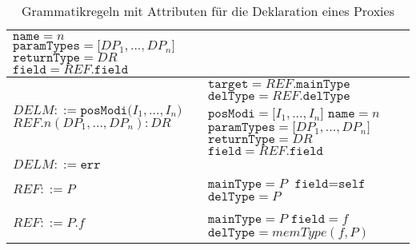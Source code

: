 \begin{table}[H]
\begin{tabular}{|p{6cm}|p{10cm}|}
$\texttt{name} = \mathit{n}$\newline
$\texttt{paramTypes} = \mathit{[DP_1},...,\mathit{DP_n]}$\newline
$\texttt{returnType} = \mathit{DR}$\newline
$\texttt{field} = \mathit{REF}\texttt{.field}$
\\
\hline
$\mathit{DELM} ::=\texttt{posModi(} \mathit{I_1},...,\mathit{I_n} \texttt{)}$\newline
$\mathit{REF}\texttt{.}n(\mathit{DP_1},...,\mathit{DP_n}):DR $  
&
$\texttt{target} = \mathit{REF}.\texttt{mainType}$\newline
$\texttt{delType} = \mathit{REF}.\texttt{delType}$\newline
$\texttt{posModi} = \mathit{[I_1},...,\mathit{I_n]}$\newline
$\texttt{name} = \mathit{n}$\newline
$\texttt{paramTypes} = \mathit{[DP_1},...,\mathit{DP_n]}$\newline
$\texttt{returnType} = \mathit{DR}$\newline
$\texttt{field} = \mathit{REF}\texttt{.field}$
\\
\hline
$\mathit{DELM} ::= \texttt{err} $  
&
\\
\hline
$\mathit{REF} ::= \mathit{P}$
& 
$\texttt{mainType} = \mathit{P}$\newline
$\texttt{field} = \texttt{self}$\newline
$\texttt{delType} = \mathit{P}$
\\
\hline
$\mathit{REF} ::= \mathit{P}\texttt{.}\mathit{f}$
&
$\texttt{mainType} = \mathit{P}$\newline
$\texttt{field} = \mathit{f}$\newline
$\texttt{delType} = \mathit{memType(f,P)}$
\\
\hline
\end{tabular}
\caption{Grammatikregeln mit Attributen für die Deklaration eines Proxies}
 \label{tab:attrGrProxies}
\end{table}
\noindent
